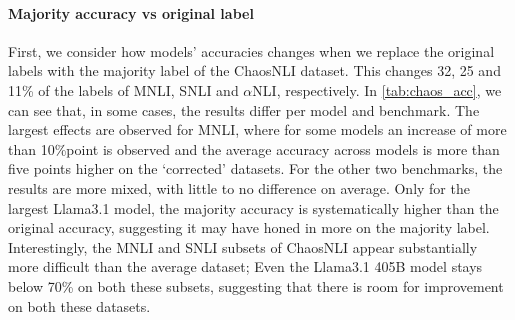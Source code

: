 \paragraph{Majority accuracy vs original label}
First, we consider how models' accuracies changes when we replace the original labels with the majority label of the ChaosNLI dataset.
This changes 32, 25 and 11\% of the labels of MNLI, SNLI and $\alpha$NLI, respectively.
In \cref{tab:chaos_acc}, we can see that, in some cases, the results differ per model and benchmark.
The largest effects are observed for MNLI, where for some models an increase of more than 10\%point is observed and the average accuracy across models is more than five points higher on the `corrected' datasets.
For the other two benchmarks, the results are more mixed, with little to no difference on average.
Only for the largest Llama3.1 model, the majority accuracy is systematically higher than the original accuracy, suggesting it may have honed in more on the majority label.
Interestingly, the MNLI and SNLI subsets of ChaosNLI appear substantially more difficult than the average dataset;
Even the Llama3.1 405B model stays below 70\% on both these subsets, suggesting that there is room for improvement on both these datasets.

